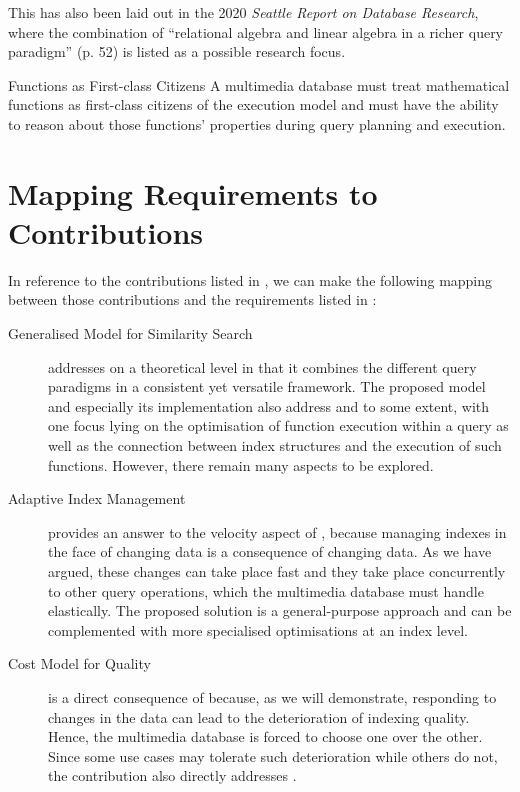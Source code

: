 This has also been laid out in the 2020 \emph{Seattle Report on Database Research}, where the combination of ``relational algebra and linear algebra in a richer query paradigm'' \cite{Abadi:2020Seattle} (p. 52) is listed as a possible research focus.

\begin{requirement}[label=requirement:functions]{Functions as First-class Citizens}{}
    A multimedia database must treat mathematical functions as first-class citizens of the execution model and must have the ability to reason about those functions' properties during query planning and execution.
\end{requirement}

\section{Mapping Requirements to Contributions}

In reference to the contributions listed in , we can make the following mapping between those contributions and the requirements listed in :

\begin{description}
    \item[Generalised Model for Similarity Search] addresses  on a theoretical level in that it combines the different query paradigms in a consistent yet versatile framework. The proposed model and especially its implementation also address  and  to some extent, with one focus lying on the optimisation of function execution within a query as well as the connection between index structures and the execution of such functions. However, there remain many aspects to be explored.
    \item[Adaptive Index Management] provides an answer to the velocity aspect of , because managing indexes in the face of changing data is a consequence of changing data. As we have argued, these changes can take place fast and they take place concurrently to other query operations, which the multimedia database must handle elastically. The proposed solution is a general-purpose approach and can be complemented with more specialised optimisations at an index level.
    \item[Cost Model for Quality] is a direct consequence of  because, as we will demonstrate, responding to changes in the data can lead to the deterioration of indexing quality. Hence, the multimedia database is forced to choose one over the other. Since some use cases may tolerate such deterioration while others do not, the contribution also directly addresses .
\end{description}